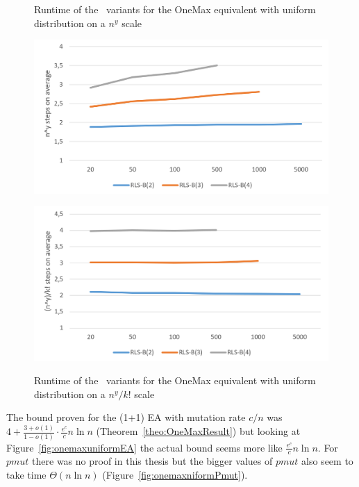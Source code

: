 \begin{figure}[h]
      \centering
      \begin{minipage}[b]{0.45\textwidth}
            \caption{Runtime of the \RLSN~variants for the OneMax equivalent with uniform distribution on a $n^y$ scale}
            \includegraphics[width=\textwidth]{figures/images/oneMaxUniformMultipleN_RLSBCompare.png}\label{fig:onemaxniformNlogNBoundRLSB}
      \end{minipage}
      \hspace{0.75cm}
      \begin{minipage}[b]{0.45\textwidth}
            \caption{Runtime of the \RLSN~variants for the OneMax equivalent with uniform distribution on a $n^y/k!$ scale}
            \includegraphics[width=\textwidth]{figures/images/oneMaxUniformMultipleN_RLSBCompareScaleWithConstant.png}\label{fig:onemaxniformNlogNBoundRLSBWeirdScale}
      \end{minipage}
\end{figure}
The bound proven for the (1+1) EA with mutation rate $c/n$ was \(4+\frac{3+o(1)}{1-o(1)}\cdot \frac{e^c}{c}n\ln n\) (Theorem~\ref{theo:OneMaxResult}) but looking at Figure~\ref{fig:onemaxuniformEA} the actual bound seems more like \(\frac{e^c}{c}n\ln n\).
For $pmut$ there was no proof in this thesis but the bigger values of $pmut$ also seem to take time $\Theta(n\ln n)$ (Figure~\ref{fig:onemaxniformPmut}).

